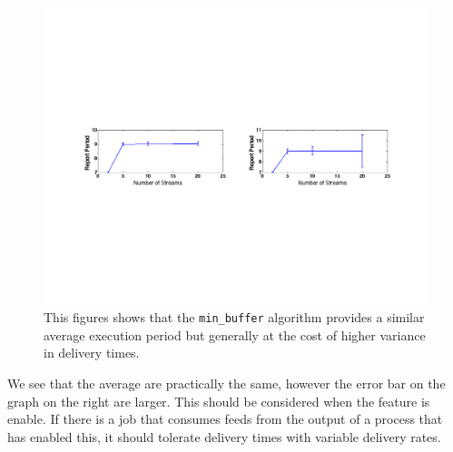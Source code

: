 \begin{figure}[th!] %
\centering
\includegraphics[width=1.0	\columnwidth]{figs/period_vs_streams}
\caption{This figures shows that the \texttt{min\_buffer} algorithm provides a similar average execution period but generally
at the cost of higher variance in delivery times.}
\label{fig:report_periods}
\end{figure}

We see that the average are practically the same, however the error bar on the graph on the right are larger.  This should be considered 
when the feature is enable.  If there is a job that consumes feeds from the output of a process that has enabled this, it should tolerate
delivery times with variable delivery rates.



